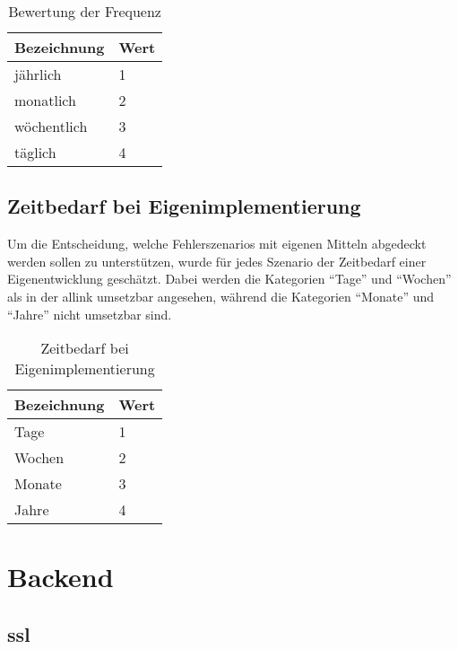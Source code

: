 \begin{table}[h!]
  \centering
  \begin{tabular}{ll}
  \toprule
    Bezeichnung & Wert\\
  \hline
    jährlich & 1\\
  \hline
    monatlich & 2\\
  \hline
    wöchentlich & 3\\
  \hline
    täglich & 4\\
  \bottomrule
  \end{tabular}
  \caption{Bewertung der Frequenz}
  \label{tab:fehler_frequenz}
\end{table}

\subsection{Zeitbedarf bei Eigenimplementierung}
\label{sub:zeitbedarf_bei_eigenimplementierung}
Um die Entscheidung, welche Fehlerszenarios mit eigenen Mitteln abgedeckt werden sollen zu unterstützen, wurde für jedes Szenario der Zeitbedarf einer Eigenentwicklung geschätzt. Dabei werden die Kategorien ``Tage'' und ``Wochen'' als in der allink umsetzbar angesehen, während die Kategorien ``Monate'' und ``Jahre'' nicht umsetzbar sind.

\begin{table}[h!]
  \centering
  \begin{tabular}{ll}
  \toprule
    Bezeichnung & Wert\\
  \hline
    Tage & 1\\
  \hline
    Wochen & 2\\
  \hline
    Monate & 3\\
  \hline
    Jahre & 4\\
  \bottomrule
  \end{tabular}
  \caption{Zeitbedarf bei Eigenimplementierung}
  \label{tab:zeitbedarf_bei_eigenimplementierung}
\end{table}

\section{Backend}
\label{sec:backend}

\subsection{\acrshort{ssl}}
\label{sub:fehler_ssl}

